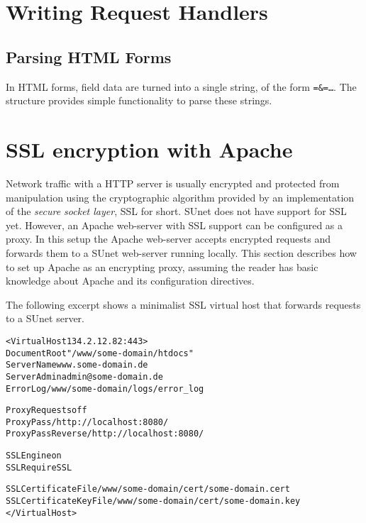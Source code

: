 \section{Writing Request Handlers}

\subsection{Parsing HTML Forms}

In HTML forms, field data are turned into a single string, of the form
\texttt{=\&=\ldots}.
The  structure provides simple functionality to
parse these strings.


\section{SSL encryption with Apache}

Network traffic with a HTTP server is usually encrypted and protected
from manipulation using the cryptographic algorithm provided by an
implementation of the \textit{secure socket layer}, SSL for short.
SUnet does not have support for SSL yet.  However, an Apache
web-server with SSL support can be configured as a proxy.  In this
setup the Apache web-server accepts encrypted requests and forwards
them to a SUnet web-server running locally.  This section describes
how to set up Apache as an encrypting proxy, assuming the reader has
basic knowledge about Apache and its configuration directives.

The following excerpt shows a minimalist SSL virtual host that
forwards requests to a SUnet server.

\begin{alltt}
<VirtualHost 134.2.12.82:443>
  DocumentRoot "/www/some-domain/htdocs"
  ServerName www.some-domain.de
  ServerAdmin admin@some-domain.de
  ErrorLog /www/some-domain/logs/error_log

  ProxyRequests off
  ProxyPass / http://localhost:8080/
  ProxyPassReverse / http://localhost:8080/

  SSLEngine on
  SSLRequireSSL

  SSLCertificateFile /www/some-domain/cert/some-domain.cert
  SSLCertificateKeyFile /www/some-domain/cert/some-domain.key
</VirtualHost>
\end{alltt}

